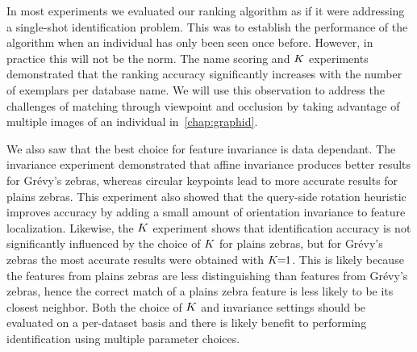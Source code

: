         In most experiments we evaluated our ranking algorithm as if it were addressing a single-shot
        identification problem. This was to establish the performance of the algorithm when an individual has only
        been seen once before. However, in practice this will not be the norm. The name scoring and $K$
        experiments demonstrated that the ranking accuracy significantly increases with the number of exemplars per
        database name. We will use this observation to address the challenges of matching through viewpoint and
        occlusion by taking advantage of multiple images of an individual in~\cref{chap:graphid}.


        We also saw that the best choice for feature invariance is data dependant. The invariance experiment
        demonstrated that affine invariance produces better results for Grévy's zebras, whereas circular keypoints
        lead to more accurate results for plains zebras. This experiment also showed that the query-side rotation
        heuristic improves accuracy by adding a small amount of orientation invariance to feature localization.
        Likewise, the $K$ experiment shows that identification accuracy is not significantly influenced by the
        choice of $K$ for plains zebras, but for Grévy's zebras the most accurate results were obtained with
        $K\mkern-6mu=\mkern-6mu1$. This is likely because the features from plains zebras are less distinguishing than features
        from Grévy's zebras, hence the correct match of a plains zebra feature is less likely to be its closest
        neighbor. Both the choice of $K$ and invariance settings should be evaluated on a per-dataset basis and
        there is likely benefit to performing identification using multiple parameter choices.


